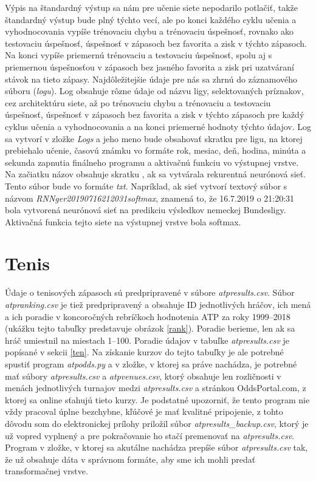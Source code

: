 Výpis na štandardný výstup sa nám pre učenie siete nepodarilo potlačiť, takže štandardný výstup bude plný týchto vecí, ale po konci každého cyklu učenia a vyhodnocovania vypíše trénovaciu chybu a trénovaciu úspešnosť, rovnako ako testovaciu úspešnosť, úspešnosť v zápasoch bez favorita a zisk v týchto zápasoch.
Na konci vypíše priemernú trénovaciu a testovaciu úspešnosť, spolu aj s priemernou úspešnosťou v zápasoch bez jasného favorita a zisk pri uzatváraní stávok na tieto zápasy. 
Najdôležitejšie údaje pre nás sa zhrnú do záznamového súboru (\textit{logu}). 
Log obsahuje rôzne údaje od názvu ligy, selektovaných príznakov, cez architektúru siete, až po trénovaciu chybu a trénovaciu a testovaciu úspešnosť, úspešnosť v zápasoch bez favorita a zisk v týchto zápasoch pre každý cyklus učenia a vyhodnocovania a na konci priemerné hodnoty týchto údajov.
Log sa vytvorí v zložke \textit{Logs} a jeho meno bude obsahovať skratku pre ligu, na ktorej prebiehalo učenie, časovú známku vo formáte rok, mesiac, deň, hodina, minúta a sekunda zapnutia finálneho programu a aktivačnú funkciu vo výstupnej vrstve. Na začiatku názov obsahuje skratku , ak sa vytvárala rekurentná neurónová sieť. Tento súbor bude vo formáte \textit{txt}.
Napríklad, ak sieť vytvorí textový súbor s názvom \textit{RNNger20190716212031softmax}, znamená to, že 16.7.2019 o 21:20:31 bola vytvorená neurónová sieť na predikciu výsledkov nemeckej Bundesligy.
Aktivačná funkcia tejto siete na výstupnej vrstve bola softmax.

\section{Tenis}

Údaje o tenisových zápasoch sú predpripravené v súbore \textit{atpresults.csv}.
Súbor \textit{atpranking.csv} je tiež predpripravený a obsahuje ID jednotlivých hráčov, ich mená a ich poradie v koncoročných rebríčkoch hodnotenia ATP za roky 1999--2018 (ukážku tejto tabuľky predstavuje obrázok \ref{rank}).
Poradie berieme, len ak sa hráč umiestnil na miestach 1--100.
Poradie údajov v tabuľke \textit{atpresults.csv} je popísané v sekcii \ref{ten}.
Na získanie kurzov do tejto tabuľky je ale potrebné spustiť program \textit{atpodds.py} a v zložke, v ktorej sa práve nachádza, je potrebné mať súbory \textit{atpresults.csv} a \textit{atpvenues.csv}, ktorý obsahuje len rozličnosti v menách jednotlivých turnajov medzi \textit{atpresults.csv} a stránkou OddsPortal.com, z ktorej sa online sťahujú tieto kurzy.
Je podstatné upozorniť, že tento program nie vždy pracoval úplne bezchybne, kľúčové je mať kvalitné pripojenie, z tohto dôvodu som do elektronickej prílohy priložil súbor \textit{atpresults\_backup.csv}, ktorý je už vopred vyplnený a pre pokračovanie ho stačí premenovať na \textit{atpresults.csv}.
Program v zložke, v ktorej sa akutálne nachádza prepíše súbor \textit{atpresults.csv} tak, že už obsahuje dáta v správnom formáte, aby sme ich mohli predať transformačnej vrstve.

